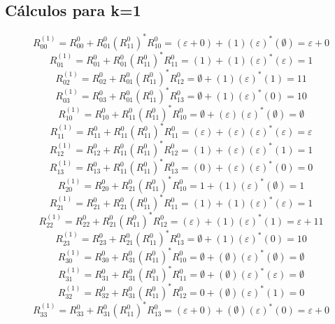 \documentclass[11pt]{article}
\begin{document}
		\subsection{Cálculos para k=1}
			\[R_{00}^{(1)}=R_{00}^{0}+R_{01}^{0}{(R_{11}^{0})}^\ast R_{10}^{0}=(\varepsilon+0)+(1)(\varepsilon)^\ast(\emptyset)=\varepsilon+0\]
			\[R_{01}^{(1)}=R_{01}^{0}+R_{01}^{0}{(R_{11}^{0})}^\ast R_{11}^{0}=(1)+(1)(\varepsilon)^\ast(\varepsilon)=1\]
			\[R_{02}^{(1)}=R_{02}^{0}+R_{01}^{0}{(R_{11}^{0})}^\ast R_{12}^{0}=\emptyset+(1)(\varepsilon)^\ast(1)=11\]
			\[R_{03}^{(1)}=R_{03}^{0}+R_{01}^{0}{(R_{11}^{0})}^\ast R_{13}^{0}=\emptyset+(1)(\varepsilon)^\ast(0)=10\]
			\[R_{10}^{(1)}=R_{10}^{0}+R_{11}^{0}{(R_{11}^{0})}^\ast R_{10}^{0}=\emptyset+(\varepsilon)(\varepsilon)^\ast(\emptyset)=\emptyset\]
			\[R_{11}^{(1)}=R_{11}^{0}+R_{11}^{0}{(R_{11}^{0})}^\ast R_{11}^{0}=(\varepsilon)+(\varepsilon)(\varepsilon)^\ast(\varepsilon)=\varepsilon\]
			\[R_{12}^{(1)}=R_{12}^{0}+R_{11}^{0}{(R_{11}^{0})}^\ast R_{12}^{0}=(1)+(\varepsilon)(\varepsilon)^\ast(1)=1\]
			\[R_{13}^{(1)}=R_{13}^{0}+R_{11}^{0}{(R_{11}^{0})}^\ast R_{13}^{0}=(0)+(\varepsilon)(\varepsilon)^\ast(0)=0\]
			\[R_{20}^{(1)}=R_{20}^{0}+R_{21}^{0}{(R_{11}^{0})}^\ast R_{10}^{0}=1+(1)(\varepsilon)^\ast(\emptyset)=1\]
			\[R_{21}^{(1)}=R_{21}^{0}+R_{21}^{0}{(R_{11}^{0})}^\ast R_{11}^{0}=(1)+(1)(\varepsilon)^\ast(\varepsilon)=1\]
			\[R_{22}^{(1)}=R_{22}^{0}+R_{21}^{0}{(R_{11}^{0})}^\ast R_{12}^{0}=(\varepsilon)+(1)(\varepsilon)^\ast(1)=\varepsilon+11\]
			\[R_{23}^{(1)}=R_{23}^{0}+R_{21}^{0}{(R_{11}^{0})}^\ast R_{13}^{0}=\emptyset+(1)(\varepsilon)^\ast(0)=10\]
			\[R_{30}^{(1)}=R_{30}^{0}+R_{31}^{0}{(R_{11}^{0})}^\ast R_{10}^{0}=\emptyset+(\emptyset)(\varepsilon)^\ast(\emptyset)=\emptyset\]
			\[R_{31}^{(1)}=R_{31}^{0}+R_{31}^{0}{(R_{11}^{0})}^\ast R_{11}^{0}=\emptyset+(\emptyset)(\varepsilon)^\ast(\varepsilon)=\emptyset\]
			\[R_{32}^{(1)}=R_{32}^{0}+R_{31}^{0}{(R_{11}^{0})}^\ast R_{12}^{0}=0+(\emptyset)(\varepsilon)^\ast(1)=0\]
			\[R_{33}^{(1)}=R_{33}^{0}+R_{31}^{0}{(R_{11}^{0})}^\ast R_{13}^{0}=(\varepsilon+0)+(\emptyset)(\varepsilon)^\ast(0)=\varepsilon+0\]
\end{document}
